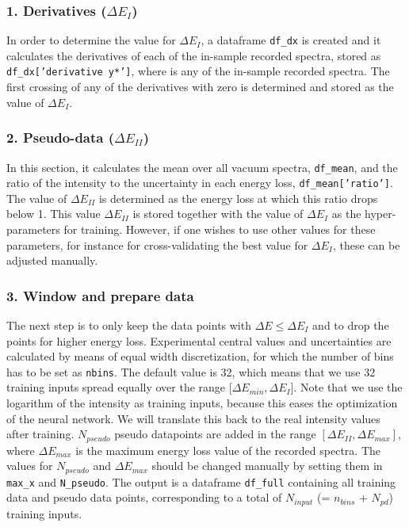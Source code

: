 \subsubsection*{1. Derivatives ($\Delta E_I$)}
In order to determine the value for $\Delta E_I$, a dataframe {\tt df\_dx} is created
and it calculates the derivatives of each of the in-sample recorded spectra, 
stored as {\tt df\_dx['derivative y*']}, where {\tt *} is any of the in-sample recorded spectra.
%
The first crossing of any of the derivatives with zero is determined 
and stored as the value of $\Delta E_I$. 
%
\subsubsection*{2. Pseudo-data ($\Delta E_{II}$)}
In this section, it calculates the mean over all vacuum spectra, {\tt df\_mean}, and the ratio of the 
intensity to the uncertainty in each energy loss, {\tt df\_mean['ratio']}. 
%
The value of $\Delta E_{II}$ is determined as the energy loss at which this ratio
drops below 1. 
%
This value $\Delta E_{II}$ is stored together with the value of $\Delta E_I$
as the hyper-parameters for training. 
%
However, if one wishes to use other values for these parameters, for instance for 
cross-validating the best value for $\Delta E_I$, these can be adjusted manually.


\subsubsection*{3. Window and prepare data}

The next step is to only keep the data points with $\Delta E \le \Delta E_I$  
and to drop the points for higher energy loss.
%
Experimental central values and uncertainties are calculated by means of equal width 
discretization, for which the number of bins has to be set as {\tt nbins}. 
%
The default value is 32, which means that we use 32 training inputs spread equally
over the range [$ \Delta E_{min}, \Delta E_I$]. 
%
Note that we use the logarithm of the intensity as training inputs, because this eases
the optimization of the neural network. We will translate this back to the real intensity
values after training.
%
$N_{pseudo}$ pseudo datapoints are added in the range $[\Delta E_{II}, \Delta E_{max}]$, where $ \Delta E_{max}$
is the maximum energy loss value of the recorded spectra. 
%
The values for $N_{pseudo}$ and $\Delta E_{max}$ should be changed manually by 
setting them in {\tt max\_x} and {\tt N\_pseudo}. 
%
The output is a dataframe {\tt df\_full} containing all training data and pseudo data points, 
corresponding to a total of $N_{input}$ (= $n_{bins}$ + $N_{pd}$) training inputs.

